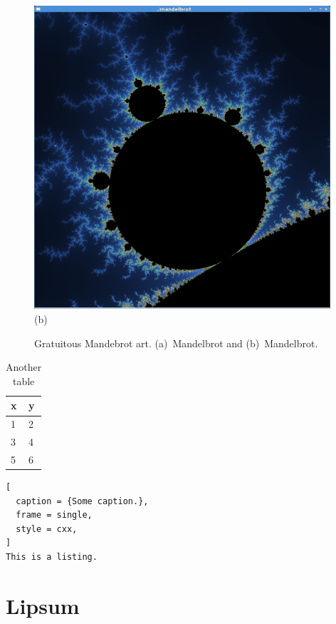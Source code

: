 \begin{figure}
\begin{minipage}{0.5\textwidth}
\includegraphics[width=0.98\textwidth]{figures/mandelbrot.png}
\\ (b)
\end{minipage}%
\caption{Gratuitous Mandebrot art.
(a)~Mandelbrot and (b)~Mandelbrot.}
\end{figure}

\begin{table}\centering%
\begin{tabular}{|l|l|}%
\hline
x & y \\
\hline
1 & 2 \\
3 & 4 \\
5 & 6 \\
\hline
\end{tabular}%
\caption{Another table}
\end{table}

\begin{lstlisting}[
  caption = {Some caption.},
  frame = single,
  style = cxx,
]
This is a listing.
\end{lstlisting}



\section{Lipsum}

\lipsum
\lipsum
\lipsum
\lipsum
